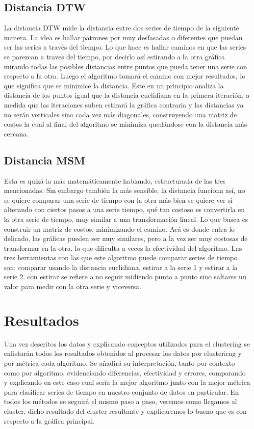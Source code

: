 \documentclass[12pt,a4paper]{article}
\begin{document}
\subsection{Distancia DTW} La distancia DTW mide la distancia entre dos series de tiempo de la siguiente manera. La idea es hallar patrones por muy desfasadas o 
diferentes que puedan ser las series a través del tiempo. Lo que hace es hallar caminos en que las series se parezcan a traves del tiempo, por decirlo así estirando 
a la otra gráfica mirando todas las posibles distancias entre puntos que pueda tener una serie con respecto a la otra. 
Luego el algoritmo tomará el camino con mejor resultados, lo que significa que se minimice la distancia. Este en un principio analiza la distancia de los puntos 
igual que la distancia euclidiana en la primera iteración, a medida que las iteraciones suben estirará la gráfica contraria y las distancias ya no serán verticales sino cada vez más diagonales, construyendo
una matriz de costos la cual al final del algoritmo se minimiza quedándose con la distancia más cercana.

\subsection{Distancia MSM} Esta es quizá la más matemáticamente hablando, estructurada de las tres mencionadas. Sin embargo también la más sensible, la distancia funciona así,
no se quiere comparar una serie de tiempo con la otra más bien se quiere ver si alterando con ciertos pasos a una serie tiempo, qué tan costoso es convertirla en la otra serie de tiempo, 
muy similar a una transformación lineal. Lo que busca es construir un matriz de costos, minimizando el camino. Acá es donde entra lo delicado, las gráficas pueden ser muy similares, pero a la vez
ser muy costosas de transformar en la otra, lo que dificulta a veces la efectividad del algoritmo. Las tres herramientas con las que este algoritmo puede comparar series de tiempo son;
comparar usando la distancia euclidiana, estirar a la serie 1 y estirar a la serie 2. con estirar se refiere a no seguir midiendo punto a punto sino saltarse un valor para medir con la otra serie y viceversa.

\section{Resultados}

    Una vez descritos los datos y explicando conceptos utilizados para el clustering se enlistarán todos los resultados obtenidos al procesar los datos
    por clusterirng y por métrica cada algoritmo. Se añadirá su interpretación, tanto 
    por contexto como por algoritmo, evidenciando diferencias, efectividad y errores, comparando y explicando en este caso cual sería la mejor algoritmo junto con la mejor métrica
    para clasificar series de tiempo en nuestro conjunto de datos en particular. En todos los métodos se seguirá el mismo paso a paso, veremos como llegamos al cluster, dicho resultado del cluster resultante y explicaremos lo bueno que es con respecto a la gráfica principal.
\end{document}
